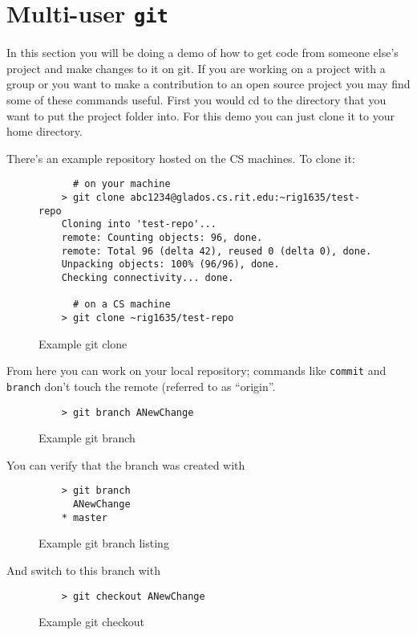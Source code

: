 \documentclass[11pt]{report}
\begin{document}
\chapter{Multi-user \texttt{git}}

In this section you will be doing a demo of how to get code from
someone else's project and make changes to it on git. If you are
working on a project with a group or you want to make a contribution
to an open source project you may find some of these commands useful.
First you would cd to the directory that you want to put the project
folder into.  For this demo you can just clone it to your home
directory.

There's an example repository hosted on the CS machines. To clone it:

\begin{figure}[H]
  \caption{Example git clone}
  \begin{lstlisting}
      # on your machine
    > git clone abc1234@glados.cs.rit.edu:~rig1635/test-repo
    Cloning into 'test-repo'...
    remote: Counting objects: 96, done.
    remote: Total 96 (delta 42), reused 0 (delta 0), done.
    Unpacking objects: 100% (96/96), done.
    Checking connectivity... done.

      # on a CS machine
    > git clone ~rig1635/test-repo
  \end{lstlisting}
\end{figure}

From here you can work on your local repository; commands like
\texttt{commit} and \texttt{branch} don't touch the remote (referred
to as ``origin''.

\begin{figure}[H]
  \caption{Example git branch}
  \begin{lstlisting}
    > git branch ANewChange
  \end{lstlisting}
\end{figure}

You can verify that the branch was created with

\begin{figure}[H]
  \caption{Example git branch listing}
  \begin{lstlisting}
    > git branch
      ANewChange
    * master
  \end{lstlisting}
\end{figure}

And switch to this branch with

\begin{figure}[H]
  \caption{Example git checkout}
  \begin{lstlisting}
    > git checkout ANewChange
  \end{lstlisting}
\end{figure}
\end{document}

